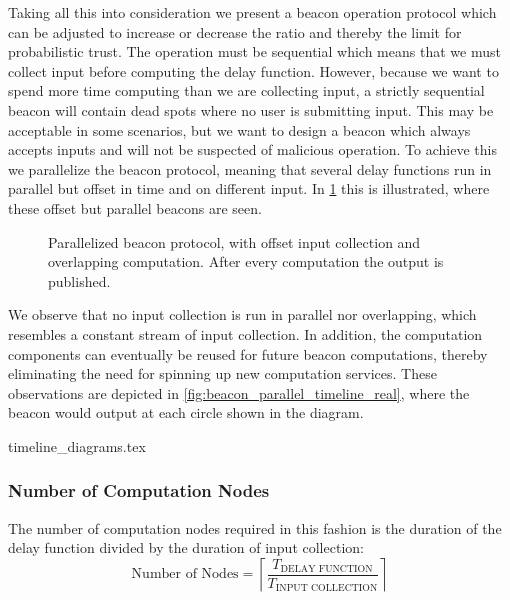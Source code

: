 Taking all this into consideration we present a beacon operation protocol which can be adjusted to increase or decrease the ratio and thereby the limit for probabilistic trust.
The operation must be sequential which means that we must collect input before computing the delay function.
However, because we want to spend more time computing than we are collecting input, a strictly sequential beacon will contain dead spots where no user is submitting input.
This may be acceptable in some scenarios, but we want to design a beacon which always accepts inputs and will not be suspected of malicious operation.
To achieve this we parallelize the beacon protocol, meaning that several delay functions run in parallel but offset in time and on different input.
In \cref{fig:beacon_parallel_timeline} this is illustrated, where these offset but parallel beacons are seen.

\begin{figure}[htb]
    \centering
    \footnotesize
    \caption{Parallelized beacon protocol, with offset input collection and overlapping computation.
After every computation the output is published.}\label{fig:beacon_parallel_timeline}
\end{figure}

We observe that no input collection is run in parallel nor overlapping, which resembles a constant stream of input collection.
In addition, the computation components can eventually be reused for future beacon computations, thereby eliminating the need for spinning up new computation services.
These observations are depicted in \vref{fig:beacon_parallel_timeline_real}, where the beacon would output at each circle shown in the diagram.

{timeline_diagrams.tex}

\subsubsection{Number of Computation Nodes}
The number of computation nodes required in this fashion is the duration of the delay function divided by the duration of input collection:
\begin{equation*}
    \text{Number of Nodes} = \left\lceil\frac{T_\text{DELAY FUNCTION}}{T_\text{INPUT COLLECTION}}\right\rceil
\end{equation*}

